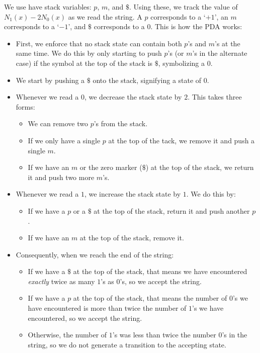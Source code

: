 \begin{Answer}
  \step
  We use have stack variables: $p$, $m$, and $\$$.
  Using these, we track the value of $N_1(x) - 2N_0(x)$
  as we read the string. A $p$ corresponds to a `$+1$', an $m$ corresponds
  to a `$-1$', and $\$$ corresponds to a $0$.
  This is how the PDA works:
  \begin{itemize}
    \item First, we enforce that no stack state can contain both $p$'s and $m$'s
      at the same time. We do this by only starting to push $p$'s (or $m$'s
      in the alternate case) if the symbol at the top of the stack is $\$$,
      symbolizing a $0$.
    \item We start by pushing a $\$$ onto the stack, signifying a state of $0$.
    \item Whenever we read a $0$, we decrease the stack state by $2$.
      This takes three forms:
      \begin{itemize}
        \item We can remove two $p$'s from the stack.
        \item If we only have a single $p$ at the top of the tack, we
          remove it and push a single $m$.
        \item If we have an $m$ or the zero marker ($\$$) at the top of the stack,
          we return it and push two more $m$'s.
      \end{itemize}
    \item Whenever we read a $1$, we increase the stack state by $1$.
      We do this by:
      \begin{itemize}
        \item If we have a $p$ or a $\$$ at the top of the stack,
          return it and push another $p$.
        \item If we have an $m$ at the top of the stack, remove it.
      \end{itemize}
    \item Consequently, when we reach the end of the string:
      \begin{itemize}
        \item If we have a $\$$ at the top of the stack,
          that means we have encountered \emph{exactly} twice as many $1$'s as $0$'s,
          so we accept the string.
        \item If we have a $p$ at the top of the stack,
          that means the number of $0$'s we have encountered is
          more than twice the number of $1$'s we have encountered,
          so we accept the string.
        \item Otherwise, the number of $1$'s was less than twice the number
          $0$'s in the string, so we do not generate a transition to the
          accepting state.
      \end{itemize}
  \end{itemize}
\end{Answer}
